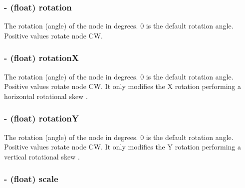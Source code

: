 \hypertarget{class_c_c_node_aecbc1fc81f9adf0ce886644e190e2680}{
\subsubsection[{rotation}]{\setlength{\rightskip}{0pt plus 5cm}-\/ (float) {\bf rotation}}}\label{class_c_c_node_aecbc1fc81f9adf0ce886644e190e2680}
The rotation (angle) of the node in degrees. 0 is the default rotation angle. Positive values rotate node C\-W. \hypertarget{class_c_c_node_a9fd979e8636f47567654cdedbba55d90}{
\subsubsection[{rotation\-X}]{\setlength{\rightskip}{0pt plus 5cm}-\/ (float) {\bf rotation\-X}}}\label{class_c_c_node_a9fd979e8636f47567654cdedbba55d90}
The rotation (angle) of the node in degrees. 0 is the default rotation angle. Positive values rotate node C\-W. It only modifies the X rotation performing a horizontal rotational skew . \hypertarget{class_c_c_node_aab0973f1a68dd4362fc16ff5af4da440}{
\subsubsection[{rotation\-Y}]{\setlength{\rightskip}{0pt plus 5cm}-\/ (float) {\bf rotation\-Y}}}\label{class_c_c_node_aab0973f1a68dd4362fc16ff5af4da440}
The rotation (angle) of the node in degrees. 0 is the default rotation angle. Positive values rotate node C\-W. It only modifies the Y rotation performing a vertical rotational skew . \hypertarget{class_c_c_node_a9c00de8556f267b63055ebd9e55f2415}{
\subsubsection[{scale}]{\setlength{\rightskip}{0pt plus 5cm}-\/ (float) {\bf scale}}}\label{class_c_c_node_a9c00de8556f267b63055ebd9e55f2415}
